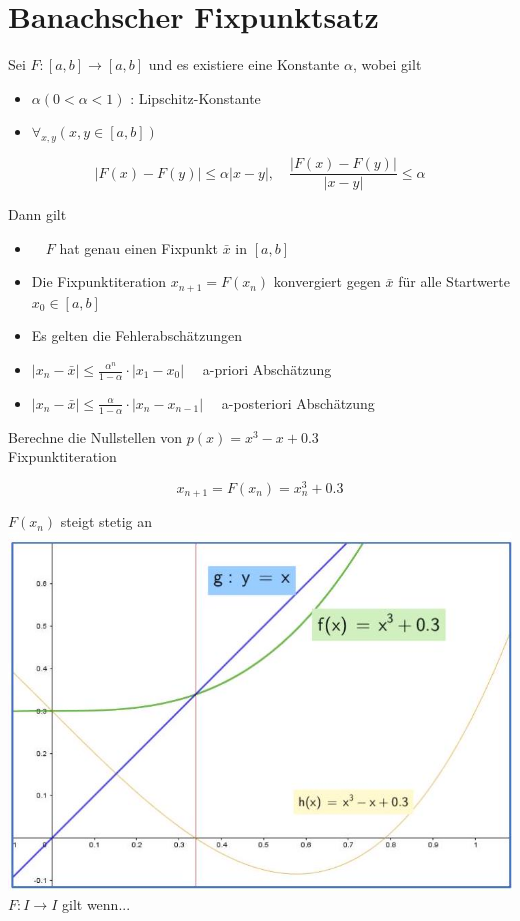 \documentclass[10pt]{article}
\begin{document}
\section*{Banachscher Fixpunktsatz}
Sei $F:[a, b] \rightarrow[a, b]$ und es existiere eine Konstante $\alpha$, wobei gilt

\begin{itemize}
  \item $\alpha(0<\alpha<1)$ : Lipschitz-Konstante
  \item $\forall_{x, y}(x, y \in[a, b])$
\end{itemize}

$$
|F(x)-F(y)| \leq \alpha|x-y|, \quad \frac{|F(x)-F(y)|}{|x-y|} \leq \alpha
$$

Dann gilt

\begin{itemize}
  \item $\quad F$ hat genau einen Fixpunkt $\bar{x}$ in $[a, b]$
  \item Die Fixpunktiteration $x_{n+1}=F\left(x_{n}\right)$ konvergiert gegen $\bar{x}$ für alle Startwerte $x_{0} \in[a, b]$
  \item Es gelten die Fehlerabschätzungen
  \item $\left|x_{n}-\bar{x}\right| \leq \frac{\alpha^{n}}{1-\alpha} \cdot\left|x_{1}-x_{0}\right| \quad$ a-priori Abschätzung
  \item $\left|x_{n}-\bar{x}\right| \leq \frac{\alpha}{1-\alpha} \cdot\left|x_{n}-x_{n-1}\right| \quad$ a-posteriori Abschätzung
\end{itemize}

Berechne die Nullstellen von $p(x)=x^{3}-x+0.3$\\
Fixpunktiteration

$$
x_{n+1}=F\left(x_{n}\right)=x_{n}^{3}+0.3
$$

$F\left(x_{n}\right)$ steigt stetig an\\
\includegraphics[max width=\textwidth, center]{2024_12_29_68ccba06d0091c162fa4g-02}\\
$F: I \rightarrow I$ gilt wenn...
\end{document}
